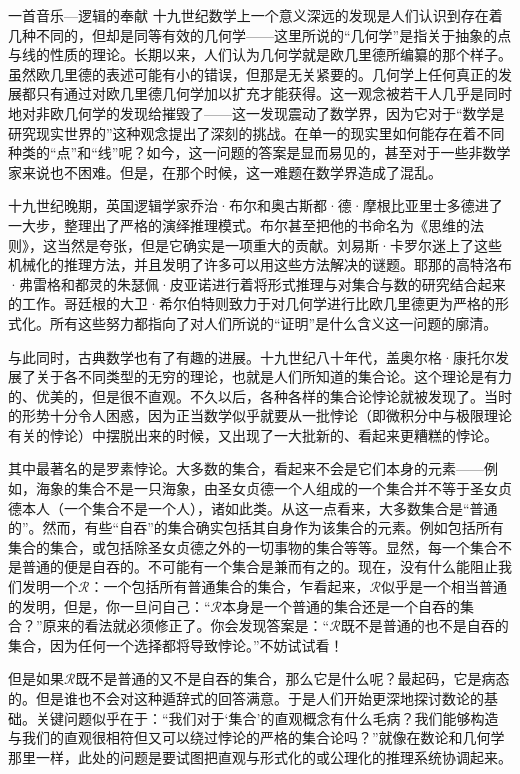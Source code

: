 \begin{intro}{一首音乐—逻辑的奉献}
十九世纪数学上一个意义深远的发现是人们认识到存在着几种不同的，但却是同等有效的几何学——这里所说的“几何学”是指关于抽象的点与线的性质的理论。长期以来，人们认为几何学就是欧几里德所编纂的那个样子。虽然欧几里德的表述可能有小的错误，但那是无关紧要的。几何学上任何真正的发展都只有通过对欧几里德几何学加以扩充才能获得。这一观念被若干人几乎是同时地对非欧几何学的发现给摧毁了——这一发现震动了数学界，因为它对于“数学是研究现实世界的”这种观念提出了深刻的挑战。在单一的现实里如何能存在着不同种类的“点”和“线”呢？如今，这一问题的答案是显而易见的，甚至对于一些非数学家来说也不困难。但是，在那个时候，这一难题在数学界造成了混乱。

十九世纪晚期，英国逻辑学家乔治·布尔和奥古斯都·德·摩根比亚里士多德进了一大步，整理出了严格的演绎推理模式。布尔甚至把他的书命名为《思维的法则》，这当然是夸张，但是它确实是一项重大的贡献。刘易斯·卡罗尔迷上了这些机械化的推理方法，并且发明了许多可以用这些方法解决的谜题。耶那的高特洛布·弗雷格和都灵的朱瑟佩·皮亚诺进行着将形式推理与对集合与数的研究结合起来的工作。哥廷根的大卫·希尔伯特则致力于对几何学进行比欧几里德更为严格的形式化。所有这些努力都指向了对人们所说的“证明”是什么含义这一问题的廓清。

与此同时，古典数学也有了有趣的进展。十九世纪八十年代，盖奥尔格·康托尔发展了关于各不同类型的无穷的理论，也就是人们所知道的集合论。这个理论是有力的、优美的，但是很不直观。不久以后，各种各样的集合论悖论就被发现了。当时的形势十分令人困惑，因为正当数学似乎就要从一批悖论（即微积分中与极限理论有关的悖论）中摆脱出来的时候，又出现了一大批新的、看起来更糟糕的悖论。

其中最著名的是罗素悖论。大多数的集合，看起来不会是它们本身的元素——例如，海象的集合不是一只海象，由圣女贞德一个人组成的一个集合并不等于圣女贞德本人（一个集合不是一个人），诸如此类。从这一点看来，大多数集合是“普通的”。然而，有些“自吞”的集合确实包括其自身作为该集合的元素。例如包括所有集合的集合，或包括除圣女贞德之外的一切事物的集合等等。显然，每一个集合不是普通的便是自吞的。不可能有一个集合是兼而有之的。现在，没有什么能阻止我们发明一个$\mathscr R$：一个包括所有普通集合的集合，乍看起来，$\mathscr R$似乎是一个相当普通的发明，但是，你一旦问自己：“$\mathscr R$本身是一个普通的集合还是一个自吞的集合？”原来的看法就必须修正了。你会发现答案是：“$\mathscr R$既不是普通的也不是自吞的集合，因为任何一个选择都将导致悖论。”不妨试试看！

但是如果$\mathscr R$既不是普通的又不是自吞的集合，那么它是什么呢？最起码，它是病态的。但是谁也不会对这种遁辞式的回答满意。于是人们开始更深地探讨数论的基础。关键问题似乎在于：“我们对于‘集合’的直观概念有什么毛病？我们能够构造与我们的直观很相符但又可以绕过悖论的严格的集合论吗？”就像在数论和几何学那里一样，此处的问题是要试图把直观与形式化的或公理化的推理系统协调起来。


\end{intro}
